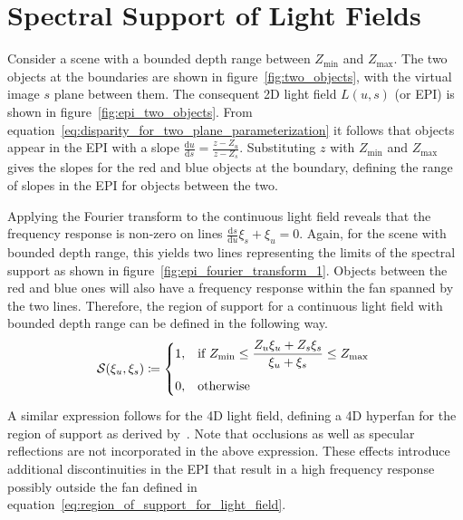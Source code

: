 \section{Spectral Support of Light Fields}
\label{sec:Spectral_Support_for_Light_Field}

Consider a scene with a bounded depth range between $Z_{\text{min}}$ and $Z_{\text{max}}$.
The two objects at the boundaries are shown in figure~\ref{fig:two_objects}, with the virtual image $s$ plane between them.
The consequent 2D light field $L(u, s)$ (or EPI) is shown in figure~\ref{fig:epi_two_objects}.
From equation~\ref{eq:disparity_for_two_plane_parameterization} it follows that objects appear in the EPI with a slope $\frac{\textrm{d}u}{\textrm{d}s} = \frac{z - Z_u}{z - Z_s}$.
Substituting $z$ with $Z_\text{min}$ and $Z_\text{max}$ gives the slopes for the red and blue objects at the boundary, defining the range of slopes in the EPI for objects between the two.

Applying the Fourier transform to the continuous light field reveals that the frequency response is non-zero on lines $\frac{\textrm{d}s}{\textrm{d}u} \xi_s + \xi_u = 0$. 
Again, for the scene with bounded depth range, this yields two lines representing the limits of the spectral support as shown in figure~\ref{fig:epi_fourier_transform_1}.
Objects between the red and blue ones will also have a frequency response within the fan spanned by the two lines.
Therefore, the region of support for a continuous light field with bounded depth range can be defined in the following way.
\begin{equation}\label{eq:region_of_support_for_light_field}
	\mathcal{S}(\xi_u, \xi_s) \coloneqq 
	    \begin{dcases*}
		    1, 			& if $Z_\text{min} \leq \dfrac{Z_u \xi_u + Z_s \xi_s}{\xi_u + \xi_s} \leq Z_\text{max}$ \\
		    0,			& otherwise $\vphantom{\dfrac{0}{0}}$ 
	    \end{dcases*}
\end{equation}
A similar expression follows for the 4D light field, defining a 4D hyperfan for the region of support as derived by~\cite{LinearVolumetricFocus}.
Note that occlusions as well as specular reflections are not incorporated in the above expression.
These effects introduce additional discontinuities in the EPI that result in a high frequency response possibly outside the fan defined in equation~\ref{eq:region_of_support_for_light_field}.

